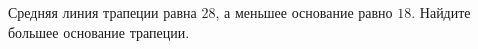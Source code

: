 \begin{ex}
	\begin{condition}
		Средняя линия трапеции равна \( 28 \), а меньшее основание равно \( 18 \). Найдите большее основание трапеции.
	\end{condition}
\end{ex}
